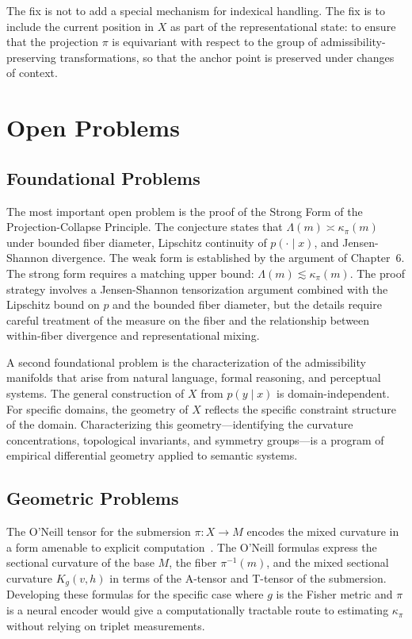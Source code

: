 \documentclass[12pt, oneside]{book}
\theoremstyle{plain-flyxion}
\theoremstyle{definition-flyxion}
\newcommand{\kpi}{\kappa_{\pi}}
\newcommand{\Lam}{\Lambda}
\begin{document}
The fix is not to add a special mechanism for indexical handling. The fix is to include
the current position in $X$ as part of the representational state: to ensure that the
projection $\pi$ is equivariant with respect to the group of admissibility-preserving
transformations, so that the anchor point is preserved under changes of context.

\chapter{Open Problems}

\section{Foundational Problems}

The most important open problem is the proof of the Strong Form of the
Projection-Collapse Principle. The conjecture states that $\Lam(m)\asymp\kpi(m)$ under
bounded fiber diameter, Lipschitz continuity of $p(\cdot\mid x)$, and Jensen-Shannon
divergence. The weak form is established by the argument of Chapter~6. The strong form
requires a matching upper bound: $\Lam(m)\lesssim\kpi(m)$. The proof strategy involves
a Jensen-Shannon tensorization argument combined with the Lipschitz bound on $p$ and the
bounded fiber diameter, but the details require careful treatment of the measure on the
fiber and the relationship between within-fiber divergence and representational mixing.

A second foundational problem is the characterization of the admissibility manifolds that
arise from natural language, formal reasoning, and perceptual systems. The general
construction of $X$ from $p(y\mid x)$ is domain-independent. For specific domains, the
geometry of $X$ reflects the specific constraint structure of the domain. Characterizing
this geometry---identifying the curvature concentrations, topological invariants, and
symmetry groups---is a program of empirical differential geometry applied to semantic
systems.

\section{Geometric Problems}

The O'Neill tensor for the submersion $\pi: X\to M$ encodes the mixed curvature in a
form amenable to explicit computation~\cite{oneill1966}. The O'Neill formulas express the
sectional curvature of the base $M$, the fiber $\pi^{-1}(m)$, and the mixed sectional
curvature $K_g(v,h)$ in terms of the A-tensor and T-tensor of the submersion. Developing
these formulas for the specific case where $g$ is the Fisher metric and $\pi$ is a neural
encoder would give a computationally tractable route to estimating $\kpi$ without relying
on triplet measurements.
\end{document}
